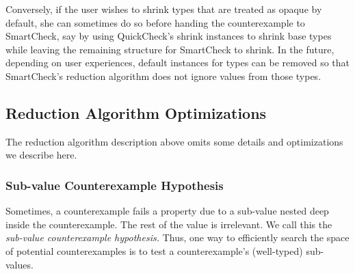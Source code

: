 \documentclass{sigplanconf}
\begin{document}
Conversely, if the user wishes to shrink types that are treated as opaque by
default, she can sometimes do so before handing the counterexample to
SmartCheck, say by using QuickCheck's shrink instances to shrink base types
while leaving the remaining structure for SmartCheck to shrink.  In the future,
depending on user experiences, default instances for types can be removed so
that SmartCheck's reduction algorithm does not ignore values from those types.

\subsection{Reduction Algorithm Optimizations}\label{sec:optimizations}
The reduction algorithm description above omits some details and optimizations
we describe here.

\subsubsection{Sub-value Counterexample Hypothesis}\label{sec:subval}
Sometimes, a counterexample fails a property due to a sub-value nested deep
inside the counterexample.  The rest of the value is irrelevant.  We call this
the \emph{sub-value counterexample hypothesis.}  Thus, one way to efficiently
search the space of potential counterexamples is to test a counterexample's
(well-typed) sub-values.
\end{document}
